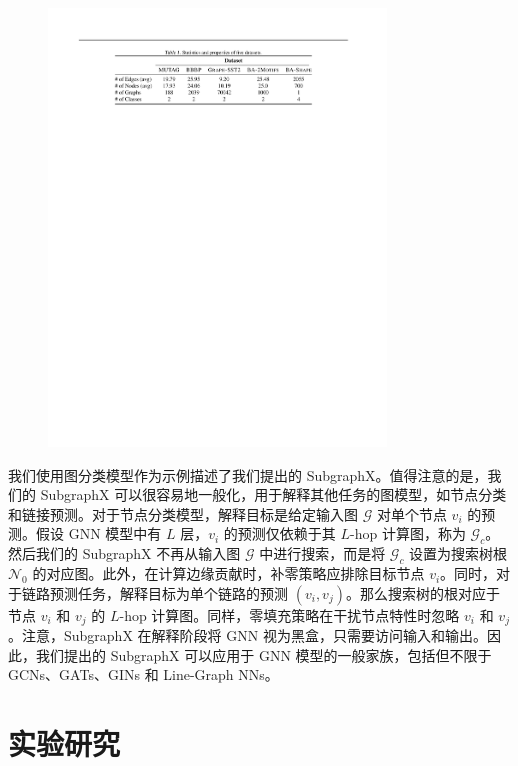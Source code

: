 \documentclass[final]{cvpr}
\begin{document}
\begin{figure}[t]
  \centering
  \includegraphics[width=0.8\textwidth]{table1.pdf}
\end{figure}

我们使用图分类模型作为示例描述了我们提出的 SubgraphX。值得注意的是，我们的 SubgraphX 可以很容易地一般化，用于解释其他任务的图模型，如节点分类和链接预测。对于节点分类模型，解释目标是给定输入图 $\mathcal{G}$ 对单个节点 $v_i$ 的预测。假设 GNN 模型中有 $L$ 层，$v_i$ 的预测仅依赖于其 $L$-hop 计算图，称为 $\mathcal{G}_c$。然后我们的 SubgraphX 不再从输入图 $\mathcal{G}$ 中进行搜索，而是将 $\mathcal{G}_c$ 设置为搜索树根 $\mathcal{N}_0$ 的对应图。此外，在计算边缘贡献时，补零策略应排除目标节点 $v_i$。同时，对于链路预测任务，解释目标为单个链路的预测 $(v_i, v_j)$。那么搜索树的根对应于节点 $v_i$ 和 $v_j$ 的 $L$-hop 计算图。同样，零填充策略在干扰节点特性时忽略 $v_i$ 和 $v_j$。注意，SubgraphX 在解释阶段将 GNN 视为黑盒，只需要访问输入和输出。因此，我们提出的 SubgraphX 可以应用于 GNN 模型的一般家族，包括但不限于GCNs、GATs、GINs 和 Line-Graph NNs。


\section{实验研究}\label{sec:Experiment}
\end{document}
